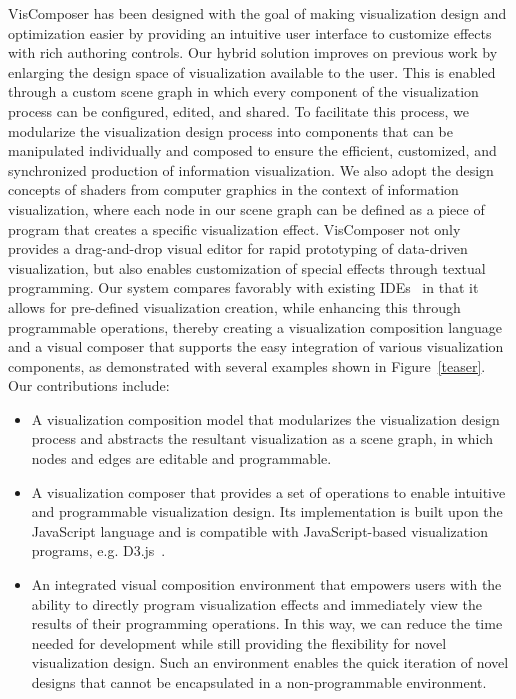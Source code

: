 VisComposer has been designed with the goal of making visualization design and optimization easier by providing an intuitive user interface to customize effects with rich authoring controls. Our hybrid solution improves on previous work by enlarging the design space of visualization available to the user.  This is enabled through a custom scene graph in which every component of the visualization process can be configured, edited, and shared.  To facilitate this process, we modularize the visualization design process into components that can be manipulated individually and composed to ensure the efficient, customized, and synchronized production of information visualization. We also adopt the design concepts of shaders from computer graphics in the context of information visualization, where each node in our scene graph can be defined as a piece of program that creates a specific visualization effect. VisComposer  not only provides a drag-and-drop visual editor for rapid prototyping of data-driven visualization, but also enables customization of special effects through textual programming. Our system compares favorably with existing IDEs~\cite{Yuan:2014:TVCG,Heer:2014:CGF} in that it allows for pre-defined visualization creation, while enhancing this through programmable operations, thereby creating a visualization composition language and a visual composer that supports the easy integration of various visualization components, as demonstrated with several examples shown in Figure~\ref{teaser}. Our contributions include:
\begin{itemize}
\item A visualization composition model that modularizes the visualization design process and abstracts the resultant visualization as a scene graph, in which nodes and edges are editable and programmable.
\item A visualization composer that provides a set of operations to enable intuitive and programmable visualization design. Its implementation is built upon the JavaScript language and is compatible with JavaScript-based visualization programs, e.g. D3.js~\cite{Heer:2011:TVCG}.
\item An integrated visual composition environment that empowers users with the ability to directly program visualization effects and immediately view the results of their programming operations.  In this way, we can reduce the time needed for development while still providing the flexibility for novel visualization design.  Such an environment enables the quick iteration of novel designs that cannot be encapsulated in a non-programmable environment.
\end{itemize}





